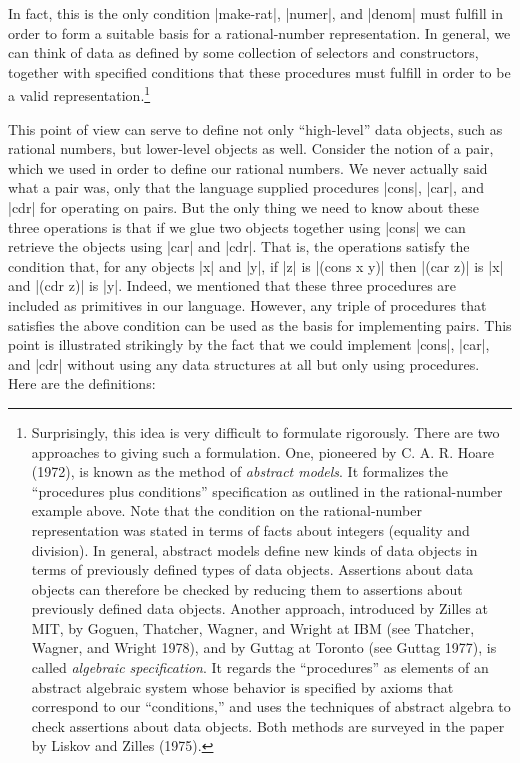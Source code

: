 In fact, this is the only condition \scheme|make-rat|, \scheme|numer|,
and \scheme|denom| must fulfill in order to form a suitable basis for
a rational-number representation.  In general, we can think of data as
defined by some collection of selectors and constructors, together
with specified conditions that these procedures must fulfill in order
to be a valid representation.\footnote{Surprisingly, this idea is very
  difficult to formulate rigorously. There are two approaches to
  giving such a formulation.  One, pioneered by C. A. R. Hoare (1972),
  is known as the method of \textit{abstract models}.  It formalizes
  the ``procedures plus conditions'' specification as outlined in the
  rational-number example above.  Note that the condition on the
  rational-number representation was stated in terms of facts about
  integers (equality and division).  In general, abstract models
  define new kinds of data objects in terms of previously defined
  types of data objects.  Assertions about data objects can therefore
  be checked by reducing them to assertions about previously defined
  data objects.  Another approach, introduced by Zilles at MIT, by
  Goguen, Thatcher, Wagner, and Wright at IBM (see Thatcher, Wagner,
  and Wright 1978), and by Guttag at Toronto (see Guttag 1977), is
  called \textit{algebraic specification}.  It regards the
  ``procedures'' as elements of an abstract algebraic system whose
  behavior is specified by axioms that correspond to our
  ``conditions,'' and uses the techniques of abstract algebra to check
  assertions about data objects.  Both methods are surveyed in the
  paper by Liskov and Zilles (1975).}


This point of view can serve to define not only ``high-level'' data
objects, such as rational numbers, but lower-level objects as well.
Consider the notion of a pair, which we used in order to define our
rational numbers.  We never actually said what a pair was, only that
the language supplied procedures \scheme|cons|, \scheme|car|, and
\scheme|cdr| for operating on pairs.  But the only thing we need to
know about these three operations is that if we glue two objects
together using \scheme|cons| we can retrieve the objects using
\scheme|car| and \scheme|cdr|.  That is, the operations satisfy the
condition that, for any objects \scheme|x| and \scheme|y|, if
\scheme|z| is \scheme|(cons x y)| then \scheme|(car z)| is \scheme|x|
and \scheme|(cdr z)| is \scheme|y|.  Indeed, we mentioned that these
three procedures are included as primitives in our language.  However,
any triple of procedures that satisfies the above condition can be
used as the basis for implementing pairs.  This point is illustrated
strikingly by the fact that we could implement \scheme|cons|,
\scheme|car|, and \scheme|cdr| without using any data structures at
all but only using procedures.  Here are the definitions:

